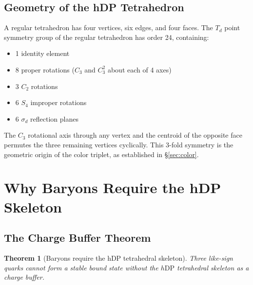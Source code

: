 \documentclass[12pt]{article}
\newtheorem{theorem}{Theorem}[section]
\newcommand{\hDP}{h\mathrm{DP}}
\begin{document}
\subsection{Geometry of the hDP Tetrahedron}

A regular tetrahedron has four vertices, six edges, and four faces.
The $T_d$ point symmetry group of the regular tetrahedron has order
24, containing:
\begin{itemize}[noitemsep]
\item 1 identity element
\item 8 proper rotations ($C_3$ and $C_3^2$ about each of 4 axes)
\item 3 $C_2$ rotations
\item 6 $S_4$ improper rotations
\item 6 $\sigma_d$ reflection planes
\end{itemize}

The $C_3$ rotational axis through any vertex and the centroid of the
opposite face permutes the three remaining vertices cyclically.  This
3-fold symmetry is the geometric origin of the color triplet, as
established in §\ref{sec:color}.

\section{Why Baryons Require the hDP Skeleton}
\label{sec:buffer}

\subsection{The Charge Buffer Theorem}

\begin{theorem}[Baryons require the hDP tetrahedral skeleton]
\label{thm:buffer}
Three like-sign quarks cannot form a stable bound state without
the $\hDP$ tetrahedral skeleton as a charge buffer.
\end{theorem}
\end{document}
